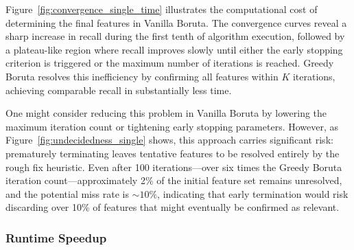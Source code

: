 \documentclass[runningheads]{llncs}
\begin{document}
Figure~\ref{fig:convergence_single_time} illustrates the computational cost of determining the
final features in Vanilla Boruta. The convergence curves reveal a sharp increase in recall
during the first tenth of algorithm execution, followed by a plateau-like region where recall
improves slowly until either the early stopping criterion is triggered or the maximum number of
iterations is reached. Greedy Boruta resolves this inefficiency by confirming all features
within $K$ iterations, achieving comparable recall in substantially less time.


One might consider reducing this problem in Vanilla Boruta by lowering the maximum iteration
count or tightening early stopping parameters. However, as Figure~\ref{fig:undecidedness_single}
shows, this approach carries significant risk: prematurely terminating leaves tentative features
to be resolved entirely by the rough fix heuristic. 
Even after 100 iterations---over six times the Greedy Boruta iteration count---approximately
2\% of the initial feature set remains unresolved, and the potential miss rate is ${\sim}10\%$,
indicating that early termination would risk discarding over 10\% of features that might
eventually be confirmed as relevant.
 
\subsubsection{Runtime Speedup}
\label{sec:experiments:speedup}
 
 
\end{document}
